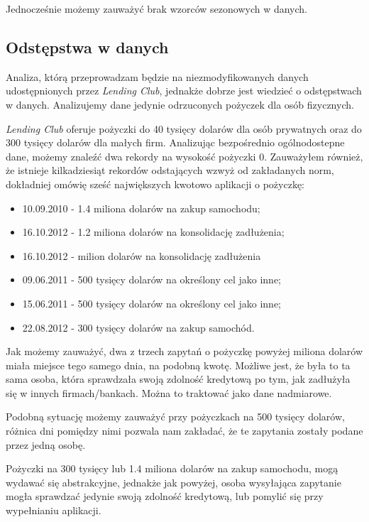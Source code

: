 \documentclass[11pt]{article}
\begin{document}
Jednocześnie możemy zauważyć brak wzorców sezonowych w danych.

\subsection{Odstępstwa w danych}

Analiza, którą przeprowadzam będzie na niezmodyfikowanych danych udostępnionych przez \textit{Lending Club}, jednakże dobrze jest wiedzieć o odstępstwach w danych. Analizujemy dane jedynie odrzuconych pożyczek dla osób fizycznych.

\textit{Lending Club} oferuje pożyczki do 40 tysięcy dolarów dla osób prywatnych oraz do 300 tysięcy dolarów dla małych firm. Analizując bezpośrednio ogólnodostepne dane, możemy znaleźć dwa rekordy na wysokość pożyczki 0. Zauważyłem również, że istnieje kilkadziesiąt rekordów odstających wzwyż od zakładanych norm, dokładniej omówię sześć największych kwotowo aplikacji o pożyczkę:
\begin{itemize}
\item 10.09.2010 - 1.4 miliona dolarów na zakup samochodu;
\item 16.10.2012 - 1.2 miliona dolarów na konsolidację zadłużenia;
\item 16.10.2012 - milion dolarów na konsolidację zadłużenia
\item 09.06.2011 - 500 tysięcy dolarów na określony cel jako inne;
\item 15.06.2011 - 500 tysięcy dolarów na określony cel jako inne;
\item 22.08.2012 - 300 tysięcy dolarów na zakup samochód.
\end{itemize}

Jak możemy zauważyć, dwa z trzech zapytań o pożyczkę powyżej miliona dolarów miała miejsce tego samego dnia, na podobną kwotę. Możliwe jest, że była to ta sama osoba, która sprawdzała swoją zdolność kredytową po tym, jak zadłużyła się w innych firmach/bankach. Można to traktować jako dane nadmiarowe.

Podobną sytuację możemy zauważyć przy pożyczkach na 500 tysięcy dolarów, różnica dni pomiędzy nimi pozwala nam zakładać, że te zapytania zostały podane przez jedną osobę.

Pożyczki na 300 tysięcy lub 1.4 miliona dolarów na zakup samochodu, mogą wydawać się abstrakcyjne, jednakże jak powyżej, osoba wysyłająca zapytanie mogła sprawdzać jedynie swoją zdolność kredytową, lub pomylić się przy wypełnianiu aplikacji.
\end{document}
